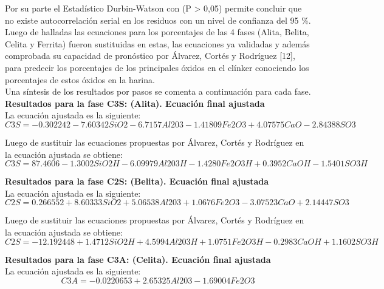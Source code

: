 \documentclass[spanish]{report}
\begin{document}
Por su parte el Estadístico Durbin-Watson con (P > 0,05) permite concluir que no existe autocorrelación serial en los residuos con un nivel de confianza del 95 \%. Luego de halladas las ecuaciones para los porcentajes de las 4 fases (Alita, Belita, Celita y Ferrita) fueron
sustituidas en estas, las ecuaciones ya validadas y además comprobada su capacidad de pronóstico por Álvarez, Cortés y Rodríguez [12], para predecir los porcentajes de los principales óxidos en el clínker conociendo los porcentajes de estos óxidos en la harina.\\

Una síntesis de los resultados por pasos se comenta a continuación para cada fase.\\

\textbf{Resultados para la fase C3S: (Alita). Ecuación final ajustada} \\

La ecuación ajustada es la siguiente:
\begin{equation}
    C3S=-0.302242-7.60342SiO2-6.7157Al203-1.41809Fe2O3+4.07575CaO-2.84388SO3
\end{equation}

Luego de sustituir las ecuaciones propuestas por Álvarez, Cortés y Rodríguez en la ecuación ajustada se obtiene:
\begin{equation}
    C3S=87.4606-1.3002SiO2H-6.09979Al203H-1.4280Fe2O3H+0.3952CaOH-1.5401SO3H
\end{equation}

\textbf{Resultados para la fase C2S: (Belita). Ecuación final ajustada}\\

La ecuación ajustada es la siguiente:
\begin{equation}
    C2S=0.266552+8.60333SiO2+5.06538Al203+1.0676Fe2O3-3.07523CaO+2.14447SO3
\end{equation}

Luego de sustituir las ecuaciones propuestas por Álvarez, Cortés y Rodríguez en la ecuación ajustada se obtiene:
\begin{equation}
    C2S=-12.192448+1.4712SiO2H+4.5994Al203H+1.0751Fe2O3H-0.2983CaOH+1.1602SO3H
\end{equation}

\textbf{Resultados para la fase C3A: (Celita). Ecuación final ajustada}\\

La ecuación ajustada es la siguiente:
\begin{equation}
    C3A=-0.0220653+2.65325Al203-1.69004Fe2O3
\end{equation}
\end{document}
